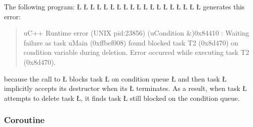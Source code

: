 \documentclass[openright,twoside]{report}
\begin{document}
The following program:
\LGinlinefalse\LGbegin\lgrinde
\L{}
\L{\LB{}}
\L{}
\L{\LB{}}
\L{}
\L{\LB{}}
\L{\LB{\};}}
\endlgrinde\LGend
\LGinlinefalse\LGbegin\lgrinde
\L{}
\L{\LB{}}
\L{\LB{}}
\L{}
\L{\LB{}}
\L{\LB{\};}}
\endlgrinde\LGend
\LGinlinefalse\LGbegin\lgrinde
\L{}
\L{\LB{}}
\L{\LB{}}
\L{\LB{}}
\L{\LB{}}
\L{\LB{\}}}
\endlgrinde\LGend
generates this error:
\begin{quote}
\BGfont
uC++ Runtime error (UNIX pid:23856) (uCondition \&)0x84410 : Waiting failure as task uMain (0xffbef008) found blocked task T2 (0x8d470) on condition variable during deletion.
Error occurred while executing task T2 (0x8d470).
\end{quote}
because the call to \LGinlinetrue\LGbegin\lgrinde\L{}\endlgrinde\LGend{} blocks task \LGinlinetrue\LGbegin\lgrinde\L{}\endlgrinde\LGend{} on condition queue \LGinlinetrue\LGbegin\lgrinde\L{}\endlgrinde\LGend{} and then task \LGinlinetrue\LGbegin\lgrinde\L{}\endlgrinde\LGend{} implicitly accepts its destructor when its \LGinlinetrue\LGbegin\lgrinde\L{}\endlgrinde\LGend{} terminates.
As a result, when task \LGinlinetrue\LGbegin\lgrinde\L{}\endlgrinde\LGend{} attempts to delete task \LGinlinetrue\LGbegin\lgrinde\L{}\endlgrinde\LGend{}, it finds task \LGinlinetrue\LGbegin\lgrinde\L{}\endlgrinde\LGend{} still blocked on the condition queue.


\subsubsection{Coroutine}
\end{document}

